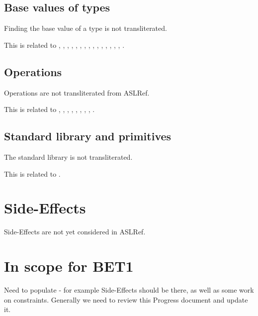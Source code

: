 \documentclass{book}
\begin{document}
\subsection{Base values of types}

Finding the base value of a type is not transliterated.

This is related to , , , ,
, , , , ,
, , , , ,
, .

\subsection{Operations}

Operations are not transliterated from ASLRef.

This is related to , , , ,
, , , , .

\subsection{Standard library and primitives}

The standard library is not transliterated.

This is related to .

\section{Side-Effects}

Side-Effects are not yet considered in ASLRef.

\section{In scope for BET1}

Need to populate - for example Side-Effects should be there, as well as some
work on constraints.
Generally we need to review this Progress document and update it.
\end{document}
